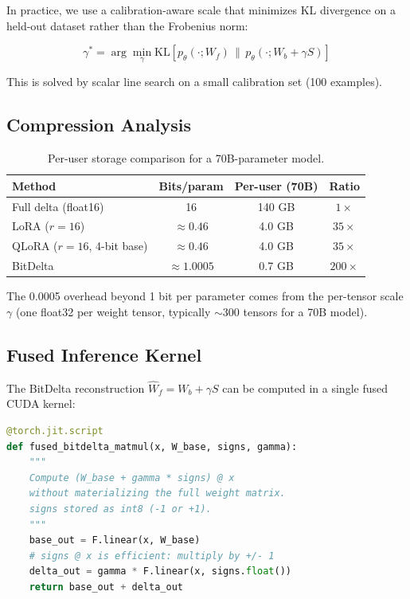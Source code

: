 \documentclass[11pt,letterpaper]{article}
\newcommand{\KL}{\mathrm{KL}}
\begin{document}
In practice, we use a calibration-aware scale that minimizes KL divergence on a held-out dataset rather than the Frobenius norm:

\begin{equation}
\gamma^* = \arg\min_{\gamma} \KL\!\left[p_\theta(\cdot; W_f) \,\|\, p_\theta(\cdot; W_b + \gamma S)\right]
\label{eq:kl_scale}
\end{equation}

This is solved by scalar line search on a small calibration set (100 examples).

\subsection{Compression Analysis}

\begin{table}[t]
\centering
\begin{tabular}{lccc}
\toprule
\textbf{Method} & \textbf{Bits/param} & \textbf{Per-user (70B)} & \textbf{Ratio} \\
\midrule
Full delta (float16) & 16 & 140 GB & $1\times$ \\
LoRA ($r=16$) & $\approx 0.46$ & 4.0 GB & $35\times$ \\
QLoRA ($r=16$, 4-bit base) & $\approx 0.46$ & 4.0 GB & $35\times$ \\
BitDelta & $\approx 1.0005$ & 0.7 GB & $200\times$ \\
\bottomrule
\end{tabular}
\caption{Per-user storage comparison for a 70B-parameter model.}
\label{tab:compression}
\end{table}

The 0.0005 overhead beyond 1 bit per parameter comes from the per-tensor scale $\gamma$ (one float32 per weight tensor, typically $\sim$300 tensors for a 70B model).

\subsection{Fused Inference Kernel}

The BitDelta reconstruction $\hat{W}_f = W_b + \gamma S$ can be computed in a single fused CUDA kernel:

\begin{lstlisting}[language=Python,caption=Fused BitDelta kernel (PyTorch)]
@torch.jit.script
def fused_bitdelta_matmul(x, W_base, signs, gamma):
    """
    Compute (W_base + gamma * signs) @ x
    without materializing the full weight matrix.
    signs stored as int8 (-1 or +1).
    """
    base_out = F.linear(x, W_base)
    # signs @ x is efficient: multiply by +/- 1
    delta_out = gamma * F.linear(x, signs.float())
    return base_out + delta_out
\end{lstlisting}
\end{document}
